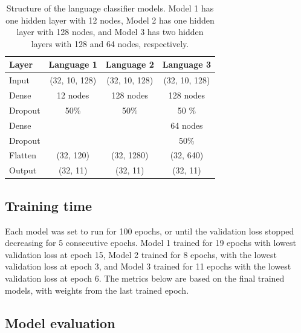 \documentclass[11pt, letterpaper]{article}
\begin{document}
\begin{table}[!h]
\begin{center}
\caption{Structure of the language classifier models. Model 1 has one hidden layer with 12 nodes, Model 2 has one hidden layer with 128 nodes, and Model 3 has two hidden layers with 128 and 64 nodes, respectively.}
\begin{tabular}{l | c |c  | c |}

Layer  & Language 1 & Language 2 & Language 3\\
\hline

Input 	& (32, 10, 128)& (32, 10, 128) & (32, 10, 128) \\ \hline

Dense	& 12 nodes 	& 128 nodes 	& 128 nodes \\
Dropout	& 50\%		& 50\%		& 50 \% \\ \hline

Dense	&			&			& 64 nodes \\
Dropout	&			& 			& 50\% \\ \hline

Flatten 	& (32, 120)	& (32, 1280)	& (32, 640) \\ \hline
Output 	& (32, 11)		& (32, 11)		& (32, 11)\\
\hline
\end{tabular}

\label{tab:LangModels}
\end{center}
\end{table}

\subsection{Training time}

Each model was set to run for 100 epochs, or until the validation loss stopped decreasing for 5 consecutive epochs. Model 1 trained for 19 epochs with lowest validation loss at epoch 15, %
Model 2 trained for 8 epochs, with the lowest validation loss at epoch 3, and %
Model 3 trained for 11 epochs with the lowest validation loss at epoch 6.%
The metrics below are based on the final trained models, with weights from the last trained epoch. %

\subsection{Model evaluation}
\end{document}
